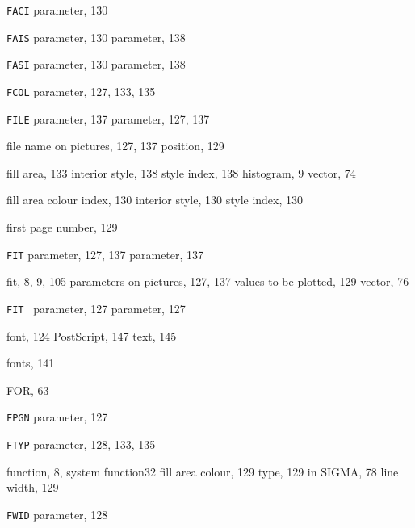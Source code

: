 \begin{theindex}
  \item {\tt FACI}
     parameter, 130
  \item {\tt FAIS}
     parameter, 130
     parameter, 138
  \item {\tt FASI}
     parameter, 130
     parameter, 138
  \item {\tt FCOL}
     parameter, 127, 133, 135
  \item {\tt FILE}
     parameter, 137
     parameter, 127, 137
  \item file name
    \subitem on pictures, 127, 137
    \subitem position, 129
  \item fill
    \subitem area, 133
      \subsubitem interior style, 138
      \subsubitem style index, 138
    \subitem histogram, 9
    \subitem vector, 74
  \item fill area
    \subitem colour index, 130
    \subitem interior style, 130
    \subitem style index, 130
  \item first page number, 129
  \item {\tt FIT}
     parameter, 127, 137
     parameter, 137
  \item fit, 8, 9, 105
    \subitem parameters on pictures, 127, 137
    \subitem values to be plotted, 129
    \subitem vector, 76
  \item {\tt FIT }
     parameter, 127
     parameter, 127
  \item font, 124
    \subitem PostScript, 147
    \subitem text, 145
  \item fonts, 141
  \item {\ttfamily  FOR}, 63
  \item {\tt FPGN}
     parameter, 127
  \item {\tt FTYP}
     parameter, 128, 133, 135
  \item function, 8, \see system function{32}
    \subitem fill area
      \subsubitem colour, 129
      \subsubitem type, 129
    \subitem in SIGMA, 78
    \subitem line width, 129
  \item {\tt FWID}
     parameter, 128

  \indexspace


\end{theindex}
